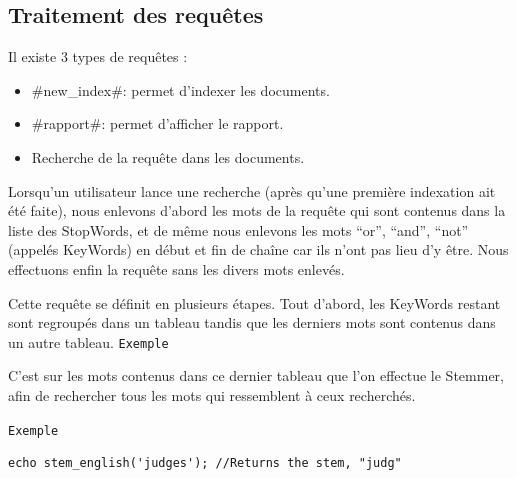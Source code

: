 \documentclass[11pt,a4paper]{article}
\begin{document}
\subsection{Traitement des requêtes}
Il existe 3 types de requêtes :

\begin{itemize}
 \item \#new\_index\#: permet d'indexer les documents.
 \item \#rapport\#: permet d'afficher le rapport.
 \item Recherche de la requête dans les documents.
\end{itemize}

Lorsqu'un utilisateur lance une recherche (après qu'une première indexation ait été faite), nous enlevons d'abord les mots de la requête qui sont contenus dans la liste des StopWords, 
et de même nous enlevons les mots ``or'', ``and'', ``not'' (appelés KeyWords) en début et fin de chaîne car ils n'ont pas lieu d'y être.
Nous effectuons enfin la requête sans les divers mots enlevés.

Cette requête se définit en plusieurs étapes. Tout d'abord, les KeyWords restant sont regroupés dans un tableau tandis que les derniers mots sont contenus dans un autre tableau.
\newline
\verb|Exemple|
\newline

\medbreak


C'est sur les mots contenus dans ce dernier tableau que l'on effectue le Stemmer, afin de rechercher tous les mots qui ressemblent à ceux recherchés.

\verb|Exemple|

\begin{lstlisting}
echo stem_english('judges'); //Returns the stem, "judg"
\end{lstlisting}

\newpage
\end{document}
